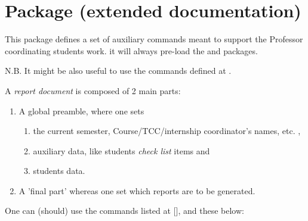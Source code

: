 \documentclass[article,nogeometry,english,tocdepth=3,secdepth=3]{ufrgscca} %
\newif\iffulldoc
\begin{document}
\fi

\iffulldoc
\section{ Package (extended documentation)}
This package defines a set of auxiliary commands meant to support the Professor coordinating students work.
it will always pre-load the  and  packages.

N.B. It might be also useful to use the commands defined at .

A \emph{report document}  is composed of 2 main parts:
\begin{enumerate}
	\item A global preamble, where one sets
	\begin{enumerate}
		\item the current semester, Course/TCC/internship coordinator's names, etc. ,
		\item auxiliary data, like students \emph{check list} items and
		\item students data.
	\end{enumerate}
    \item A 'final part' whereas one set which reports are to be generated.
\end{enumerate}

One can (should) use the commands listed at [], and these below:
\end{document}
